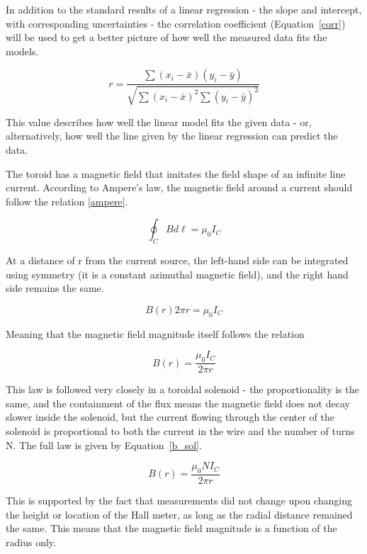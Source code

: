 \documentclass[journal]{IEEEtran}
\begin{document}
In addition to the standard results of a linear regression - the slope and
intercept, with corresponding uncertainties - the correlation coefficient
(Equation~\ref{corr}) will be used to get a better picture of how well the
measured data fits the models.

\begin{equation}
\label{corr}
r = \frac{\sum (x_i - \bar x)(y_i - \bar y)}{\sqrt{\sum (x_i - \bar x)^2
\sum(y_i - \bar y)^2}}
\end{equation}

This value describes how well the linear model fits the given data - or,
alternatively, how well the line given by the linear regression can predict the
data.

The toroid has a magnetic field that imitates the field shape of an infinite
line current. According to Ampere's law, the magnetic field around a current
should follow the relation \ref{ampere}.

\begin{equation}
\label{ampere}
\oint_C {Bd\ell = \mu _0 I_C }
\end{equation}

At a distance of r from the current source, the left-hand side can be
integrated using symmetry (it is a constant azimuthal magnetic field), and the
right hand side remains the same.

\begin{displaymath}
B(r) 2 \pi r = \mu _0 I_C
\end{displaymath}

Meaning that the magnetic field magnitude itself follows the relation

\begin{displaymath}
B(r) = \frac{\mu _0 I_C}{2 \pi r}
\end{displaymath}

This law is followed very closely in a toroidal solenoid - the proportionality
is the same, and the containment of the flux means the magnetic field does not
decay slower inside the solenoid, but the current flowing through the center of
the solenoid is proportional to both the current in the wire and the number of
turns N. The full law is given by Equation~\ref{b_sol}.

\begin{equation}
\label{b_sol}
B(r) = \frac{\mu _0 N I_C}{2 \pi r}
\end{equation}

This is supported by the fact that measurements did not change upon changing
the height or location of the Hall meter, as long as the radial distance
remained the same. This means that the magnetic field magnitude is a function
of the radius only.
\end{document}
